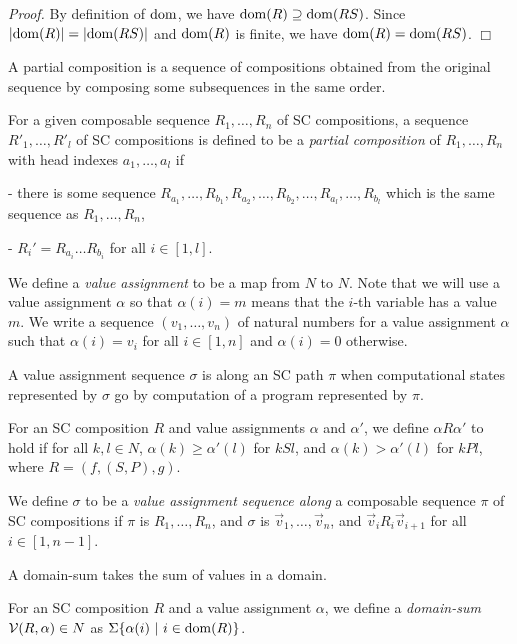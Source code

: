 {\em Proof.}
By definition of ${\rm dom}$, we have ${\rm dom}(R) \supseteq {\rm dom}(RS)$.
Since $|{\rm dom}(R)|=|{\rm dom}(RS)|$ and ${\rm dom}(R)$ is finite,
we have ${\rm dom}(R) = {\rm dom}(RS)$.
$\Box$

A partial composition is a sequence of compositions
obtained from 
the original sequence
by composing some subsequences in the same order.

\begin{Def}\rm
For a given composable sequence $R_1,\ldots,R_n$ of SC compositions,
a sequence $R'_1,\ldots,R'_l$ of SC compositions
is defined to be a {\em partial composition} of $R_1,\ldots,R_n$
with head indexes $a_1,\ldots,a_l$
if 

- there is some sequence $R_{a_1},\ldots,R_{b_1},R_{a_2},\ldots,R_{b_2},\ldots, R_{a_l},\ldots,R_{b_l}$
which is the same sequence as $R_1,\ldots,R_n$,

- $R_i' = R_{a_i}\ldots R_{b_i}$ for all $i \in [1,l]$.
\end{Def}

\begin{Def}\rm
We define a {\em value assignment} to be a map from $N$ to $N$.
Note that we will use a value assignment $\alpha$ so that
$\alpha(i)=m$ means that the $i$-th variable has a value $m$.
%
We write a sequence $(v_1,\ldots,v_n)$ of natural numbers for
a value assignment $\alpha$ such that
$\alpha(i)=v_i$ for all $i \in [1,n]$ and
$\alpha(i)=0$ otherwise.
\end{Def}

A value assignment sequence $\sigma$ is along an SC path $\pi$
when 
computational states represented by $\sigma$
go 
by
computation of a program represented by $\pi$.

\begin{Def}\rm

For an SC composition $R$ and value assignments $\alpha$ and $\alpha'$,
we define $\alpha R \alpha'$ to hold if for all $k,l \in N$,
$\alpha(k) \ge \alpha'(l)$ for $k S l$, and
$\alpha(k) > \alpha'(l)$ for $k P l$,
where
$R = (f,(S,P),g)$.

We define $\sigma$ to be a {\em value assignment sequence along} 
a composable sequence $\pi$ of SC compositions 
if $\pi$ is $R_1,\ldots, R_n$, and $\sigma$ is $\Vec v_1,\ldots,\Vec v_n$,
and $\Vec v_i R_i \Vec v_{i+1}$ for all $i \in [1,n-1]$.
\end{Def}

A domain-sum takes the sum of values in a domain.

\begin{Def}\rm
For an SC composition $R$ and a value assignment $\alpha$,
we define a {\em domain-sum} ${{\mathcal V}}(R,\alpha) \in N$
as $\Sigma \{ \alpha(i) \ |\ i \in {\rm dom}(R) \}$.
\end{Def}

